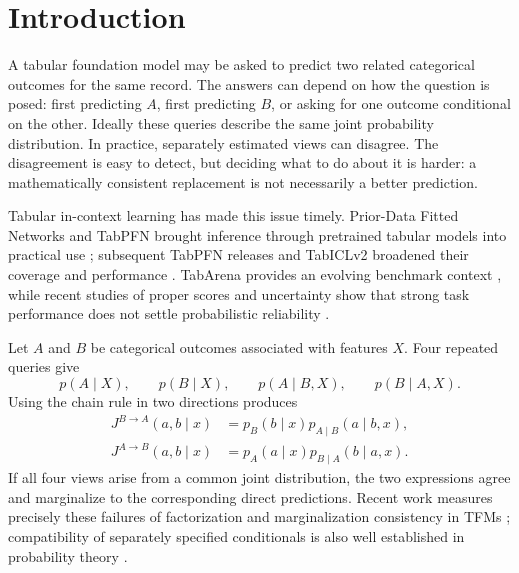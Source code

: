 \documentclass[a4paper,fleqn]{cas-sc}
\newcommand{\Jone}{J^{B\rightarrow A}}
\newcommand{\Jtwo}{J^{A\rightarrow B}}
\begin{document}
\maketitle

\section{Introduction}
A tabular foundation model may be asked to predict two related categorical outcomes for the same record. The answers can depend on how the question is posed: first predicting $A$, first predicting $B$, or asking for one outcome conditional on the other. Ideally these queries describe the same joint probability distribution. In practice, separately estimated views can disagree. The disagreement is easy to detect, but deciding what to do about it is harder: a mathematically consistent replacement is not necessarily a better prediction.

Tabular in-context learning has made this issue timely. Prior-Data Fitted Networks and TabPFN brought inference through pretrained tabular models into practical use \citep{muller2022pfns,hollmann2023tabpfn,hollmann2025tabpfn}; subsequent TabPFN releases and TabICLv2 broadened their coverage and performance \citep{grinsztajn2025tabpfn25,grinsztajn2026tabpfn3,qu2026tabiclv2}. TabArena provides an evolving benchmark context \citep{erickson2025tabarena}, while recent studies of proper scores and uncertainty show that strong task performance does not settle probabilistic reliability \citep{landsgesell2026scoringbench,johnson2026uq,costa2026lowreliability,tanna2026ensembling}.

Let $A$ and $B$ be categorical outcomes associated with features $X$. Four repeated queries give
\begin{equation}
p(A\mid X),\qquad p(B\mid X),\qquad p(A\mid B,X),\qquad p(B\mid A,X).
\end{equation}
Using the chain rule in two directions produces
\begin{align}
\Jone(a,b\mid x)&=p_B(b\mid x)p_{A\mid B}(a\mid b,x),\\
\Jtwo(a,b\mid x)&=p_A(a\mid x)p_{B\mid A}(b\mid a,x).
\end{align}
If all four views arise from a common joint distribution, the two expressions agree and marginalize to the corresponding direct predictions. Recent work measures precisely these failures of factorization and marginalization consistency in TFMs \citep{klotergens2026agree}; compatibility of separately specified conditionals is also well established in probability theory \citep{majid2025consistent,mure2019compromise}.
\end{document}
